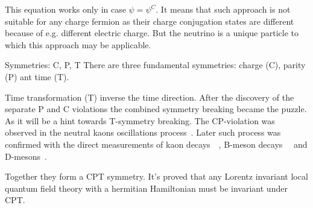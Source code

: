 \documentclass[../main.tex]{subfiles}
\begin{document}
This equation works only in case $\psi=\psi^C$. It means that such approach is not suitable for any charge fermion as their charge conjugation states are different because of e.g. different electric charge. But the neutrino is a unique particle to which this approach may be applicable.

\begin{bclogo}[couleur=blue!2, arrondi=0.1, logo=\bcinfo, nobreak=true]{Symmetries: C, P, T}
There are three fundamental symmetries: charge (C), parity (P) ant time (T).



Time transformation (T) inverse the time direction. After the discovery of the separate P and C violations the combined symmetry breaking became the puzzle. As it will be a hint towards T-symmetry breaking. The CP-violation was observed in the neutral kaons oscillations process~\cite{Christenson1964}. Later such process was confirmed with the direct measurements of kaon decays~\cite{Alavi-Harati1999}~\cite{Fanti1999}, B-meson decays~\cite{Aubert2001}~\cite{Abe2001} and D-mesons~\cite{Aaij2019}.

Together they form a CPT symmetry. It's proved that any Lorentz invariant local quantum field theory with a hermitian Hamiltonian must be invariant under CPT.
\end{bclogo}
\end{document}

